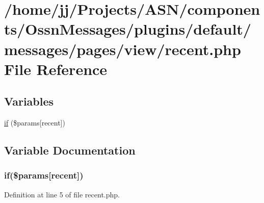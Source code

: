 \hypertarget{recent_8php}{}\section{/home/jj/\+Projects/\+A\+S\+N/components/\+Ossn\+Messages/plugins/default/messages/pages/view/recent.php File Reference}
\label{recent_8php}
\subsection*{Variables}
\begin{DoxyCompactItemize}
\item 
\hyperlink{recent_8php_a8310ac66d015bc317b9322bc2bcd45db}{if} (\$params\mbox{[}\textquotesingle{}recent\textquotesingle{}\mbox{]})
\end{DoxyCompactItemize}


\subsection{Variable Documentation}
\subsubsection[{\texorpdfstring{if}{if}}]{\setlength{\rightskip}{0pt plus 5cm}if(\$params\mbox{[}\textquotesingle{}recent\textquotesingle{}\mbox{]})}\hypertarget{recent_8php_a8310ac66d015bc317b9322bc2bcd45db}{}\label{recent_8php_a8310ac66d015bc317b9322bc2bcd45db}


Definition at line 5 of file recent.\+php.

